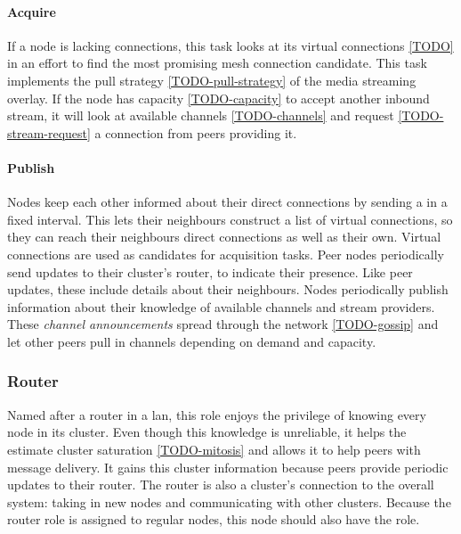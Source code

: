 \paragraph{Acquire}
\begin{itemize}
     If a node is lacking connections, this task looks at its virtual connections \ref{TODO} in an effort to find the most promising mesh connection candidate. 
     This task implements the pull strategy \ref{TODO-pull-strategy} of the media streaming overlay. If the node has capacity \ref{TODO-capacity} to accept another inbound stream, it will look at available channels \ref{TODO-channels} and request \ref{TODO-stream-request} a connection from peers providing it.
\end{itemize}

\paragraph{Publish}
\begin{itemize}
     Nodes keep each other informed about their direct connections  by sending a \peerUpdate in a fixed interval. This lets their neighbours construct a list of virtual connections, so they can reach their neighbours direct connections as well as their own. Virtual connections are used as candidates for acquisition tasks.
     Peer nodes periodically send updates to their cluster's router, to indicate their presence. Like peer updates, these include details about their neighbours.
     Nodes periodically publish information about their knowledge of available channels and stream providers. These \textit{channel announcements} spread through the network \ref{TODO-gossip} and let other peers pull in channels depending on demand and capacity.
\end{itemize}

\subsubsection{Router}
Named after a router in a \gls{lan}, this role enjoys the privilege of knowing every node in its cluster. Even though this knowledge is unreliable, it helps the \routerRole estimate cluster saturation \ref{TODO-mitosis} and allows it to help peers with message delivery. It gains this cluster information because peers provide periodic updates to their router. The router is also a cluster's connection to the overall system: taking in new nodes and communicating with other clusters. Because the router role is assigned to regular nodes, this node should also have the \peerRole role.

